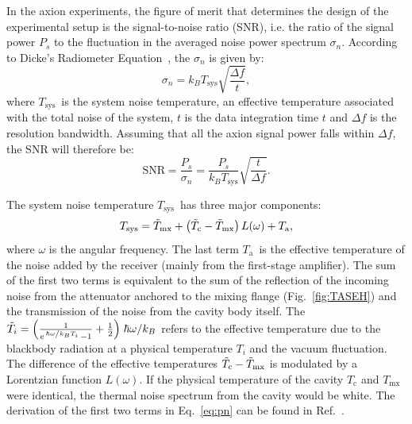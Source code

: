 \documentclass[%
 reprint,prl, %
superscriptaddress,
nobibnotes,
 amsmath,amssymb,
 aps,
]{revtex4-2}
\newcommand{\tsys}{\ensuremath{T_\text{sys}}}
\newcommand{\ta}{\ensuremath{T_\text{a}}}
\newcommand{\noise}{\ensuremath{1.9 - 2.2}}
\begin{document}
In the axion experiments, the figure of merit that determines the design of 
the experimental setup is the signal-to-noise ratio
(SNR), i.e. the ratio of the signal power $P_s$ to the fluctuation in 
the averaged noise power spectrum $\sigma_n$. 
According to Dicke's Radiometer Equation~\cite{Dicke}, the $\sigma_n$ 
is given by: 
\begin{equation}
 \sigma_n  =  k_B\tsys\sqrt{\frac{\Delta f}{t}}, 
 \label{eq:sigman}
\end{equation}
where \tsys\ is the system noise temperature, an effective 
temperature associated with the total noise of the system, 
$t$ is the data integration time $t$ 
and $\Delta f$ is the resolution bandwidth. 
Assuming that all the axion signal power falls within $\Delta f$, 
the SNR will therefore be:
\begin{equation}
   \text{SNR}  =  \frac{P_s}{\sigma_n}=  \frac{P_s}{k_B\tsys}\sqrt{\frac{t}{\Delta f}}.
 \label{eq:SNR}
\end{equation}  


The system noise temperature \tsys\ has three major components:
\begin{equation}
 \tsys = \Tilde{T}_\text{mx} + \left(\Tilde{T}_\text{c}-\Tilde{T}_\text{mx}\right)L(\omega) + \ta,
\label{eq:pn}
\end{equation}
where $\omega$ is the angular frequency.
The last term \ta\ is the effective temperature of the
noise added by the receiver (mainly from the first-stage amplifier).
The sum of the first two terms is equivalent 
to the sum of the reflection of the incoming noise from
the attenuator anchored to the mixing flange (Fig.~\ref{fig:TASEH}) 
and the transmission of the noise from the cavity body itself.
The
$\Tilde{T}_i=\left(\frac{1}{e^{\left.\hbar\omega\middle/k_BT_i\right.}-1} + \frac{1}{2}\right)\left. \hbar\omega\middle/k_B\right.$ refers to
the effective temperature due to
the blackbody radiation at a physical temperature $T_i$ and
the vacuum fluctuation.
The difference
of the effective temperatures $\Tilde{T}_\text{c}-\Tilde{T}_\text{mx}$ is
modulated by a Lorentzian function $L(\omega)$. 
If the physical temperature of the cavity $T_\text{c}$ and $T_\text{mx}$ 
were identical, the thermal noise spectrum from the cavity would be white. 
The derivation of the first two terms in Eq.~\eqref{eq:pn} can be found in
Ref.~\cite{TASEHAnalysis}. 
%
%
\end{document}

